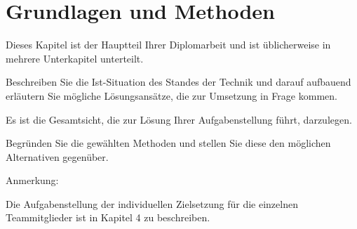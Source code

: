 \chapter{Grundlagen und Methoden}\label{sec:basics}

Dieses Kapitel ist der Hauptteil Ihrer Diplomarbeit und ist üblicherweise in
mehrere Unterkapitel unterteilt.

Beschreiben Sie die Ist-Situation des Standes der Technik und darauf aufbauend erläutern Sie mögliche Lösungsansätze, die zur Umsetzung in Frage kommen.

Es ist die Gesamtsicht, die zur Lösung Ihrer Aufgabenstellung führt, darzulegen.

Begründen Sie die gewählten Methoden und stellen Sie diese den möglichen Alternativen gegenüber.


Anmerkung:

Die Aufgabenstellung der individuellen Zielsetzung für die einzelnen Teammitglieder ist in Kapitel 4 zu beschreiben.
